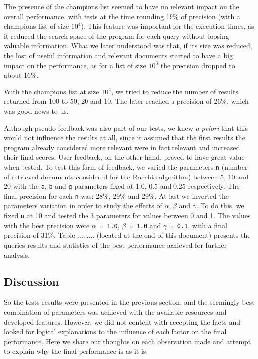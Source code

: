 \documentclass[12pt]{article}
\begin{document}
The presence of the champions list seemed to have no relevant impact on the 
overall performance, with tests at the time rounding 19\% of precision
(with a champions list of size $10^4$).
This feature was important for the execution times, as it reduced the search 
space of the program for each query without loosing valuable information.
What we later understood was that, if its size was reduced, the lost of useful
information and relevant documents started to have a big impact on the performance,
as for a list of size $10^3$ the precision dropped to about 16\%.

With the champions list at size $10^4$, we tried to reduce the number of results
returned from 100 to 50, 20 and 10. 
The later reached a precision of 26\%, which was good news to us.

Although pseudo feedback was also part of our tests, we knew \textit{a priori} 
that this would not influence the results at all, since it assumed that the first
results the program already considered more relevant were in fact relevant and 
increased their final scores.
User feedback, on the other hand, proved to have great value when tested.
To test this form of feedback, we varied the parameters \texttt{n} (number of 
retrieved documents considered for the Rocchio algorithm) between 5, 10 and 20
with the \texttt{a}, \texttt{b} and \texttt{g} parameters fixed at 1.0, 0.5 and
0.25 respectively.
The final precision for each \texttt{n} was: 28\%, 29\% and 29\%. 
At last we inverted the parameters variation in order to study the effects of 
$\alpha$, $\beta$ and $\gamma$.
To do this, we fixed \texttt{n} at 10 and tested the 3 parameters for values
between 0 and 1.
The values with the best precision were \texttt{$\alpha$ = 1.0}, 
\texttt{$\beta$ = 1.0} and \texttt{$\gamma$ = 0.1}, with a final precision of 31\%.
Table ......... (located at the end of this document) presents the queries results
and statistics of the best performance achieved for further analysis.

\subsection{Discussion}\label{discussion}

So the tests results were presented in the previous section, and the seemingly
best combination of parameters was achieved with the available resources and 
developed features.
However, we did not content with accepting the facts and looked for logical
explanations to the influence of each factor on the final performance.
Here we share our thoughts on each observation made and attempt to explain why
the final performance is as it is.
\end{document}
